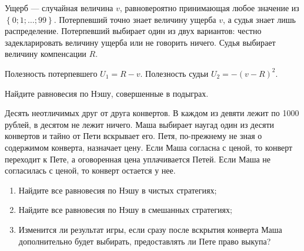 \begin{problem}
Ущерб --- случайная величина  $v$, равновероятно принимающая любое значение из  $\left\{0;1;\ldots ;99\right\}$. Потерпевший точно знает величину ущерба  $v$, а судья знает лишь распределение. Потерпевший выбирает один из двух вариантов: честно задекларировать величину ущерба или не говорить ничего. Судья выбирает величину компенсации  $R$.\par
Полезность потерпевшего  $U_{1} =R-v$. Полезность судьи  $U_{2} =-\left(v-R\right)^{2} $.\par
Найдите равновесия по Нэшу, совершенные в подыграх.



\begin{sol}

\end{sol}
\end{problem}



\begin{problem}
Десять неотличимых друг от друга конвертов. В каждом из девяти лежит по 1000 рублей, в десятом не лежит ничего. Маша выбирает наугад один из десяти конвертов и тайно от Пети вскрывает его. Петя, по-прежнему не зная о содержимом конверта, назначает цену. Если Маша согласна с ценой, то конверт переходит к Пете, а оговоренная цена уплачивается Петей. Если Маша не согласилась с ценой, то конверт остается у нее.\par
\begin{enumerate}
\item Найдите все равновесия по Нэшу в чистых стратегиях;\par
\item Найдите все равновесия по Нэшу в смешанных стратегиях;\par
\item  Изменится ли результат игры, если сразу после вскрытия конверта Маша дополнительно будет выбирать, предоставлять ли Пете право выкупа?
\end{enumerate}


\begin{sol}

\end{sol}
\end{problem}



